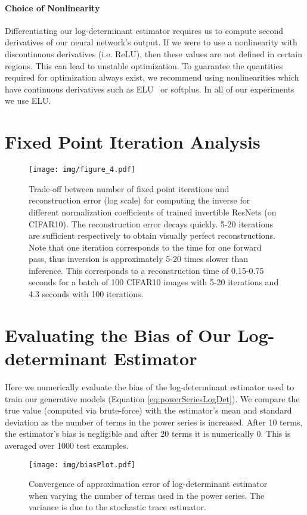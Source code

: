 \documentclass{article}
\begin{document}
\paragraph{Choice of Nonlinearity} Differentiating our log-determinant estimator requires us to compute second derivatives of our neural network's output. If we were to use a nonlinearity with discontinuous derivatives (i.e. ReLU), then these values are not defined in certain regions. This can lead to unstable optimization. To guarantee the quantities required for optimization always exist, we recommend using nonlinearities which have continuous derivatives such as ELU~\citep{DBLP:journals/corr/ClevertUH15} or softplus. In all of our experiments we use ELU.

\section{Fixed Point Iteration Analysis}
\label{app:iterationtradeoff}

\begin{figure}[H]
    \centering
    {{\texttt{[image: img/figure\_4.pdf]} }}\caption{Trade-off between number of fixed point iterations and reconstruction error (log scale) for computing the inverse for different normalization coefficients of trained invertible ResNets (on CIFAR10). The reconstruction error decays quickly. 5-20 iterations are sufficient respectively to obtain visually perfect reconstructions. Note that one iteration corresponds to the time for one forward pass, thus inversion is approximately 5-20 times slower than inference. This corresponds to a reconstruction time of 0.15-0.75 seconds for a batch of 100 CIFAR10 images with 5-20 iterations and 4.3 seconds with 100 iterations.}\label{fig:reconError}\end{figure}

\section{Evaluating the Bias of Our Log-determinant Estimator}
\label{sec:numbias}
Here we numerically evaluate the bias of the log-determinant estimator used to train our generative models (Equation \eqref{eq:powerSeriesLogDet}). We compare the true value (computed via brute-force) with the estimator's mean and standard deviation as the number of terms in the power series is increased. After 10 terms, the estimator's bias is negligible and after 20 terms it is numerically 0. This is averaged over 1000 test examples.
\begin{figure}[H]
    \centering
    {{\texttt{[image: img/biasPlot.pdf]} }}\caption{Convergence of approximation error of log-determinant estimator when varying the number of terms used in the power series. The variance is due to the stochastic trace estimator.}\label{fig:biasPlotAppendix}\end{figure}
\end{document}
